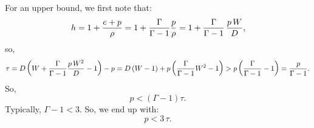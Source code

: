 For an upper bound, we first note that:
\begin{equation}
h=1+\frac{e+p}{\rho}=1+\frac{\Gamma}{\Gamma-1}\frac{p}{\rho}=1+\frac{\Gamma}{\Gamma-1}\,\frac{p\,W}{D},
\end{equation}
so,
\begin{equation}
    \tau=D\left(W+\frac{\Gamma}{\Gamma-1}\frac{p\,W^{2}}{D}-1\right)-p=D\left(W-1\right)+p\left(\frac{\Gamma}{\Gamma-1}W^{2}-1\right)>p\left(\frac{\Gamma}{\Gamma-1}-1\right)=\frac{p}{\Gamma-1}.
\end{equation}
So,
\begin{equation}
    p<\left(\Gamma-1\right)\tau.
\end{equation}
Typically, $\Gamma-1<3$. So, we end up with:
\begin{equation}
    p<3\,\tau.
\end{equation}
